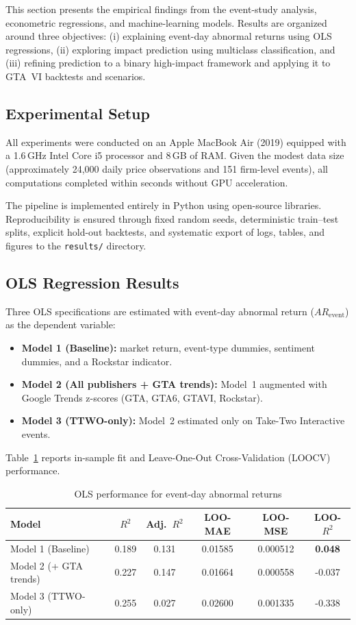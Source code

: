 \documentclass[11pt,a4paper]{article}
\begin{document}
This section presents the empirical findings from the event-study analysis, econometric regressions, and machine-learning models. Results are organized around three objectives: (i) explaining event-day abnormal returns using OLS regressions, (ii) exploring impact prediction using multiclass classification, and (iii) refining prediction to a binary high-impact framework and applying it to GTA~VI backtests and scenarios.

\subsection{Experimental Setup}

All experiments were conducted on an Apple MacBook Air (2019) equipped with a 1.6\,GHz Intel Core i5 processor and 8\,GB of RAM. Given the modest data size (approximately 24{,}000 daily price observations and 151 firm-level events), all computations completed within seconds without GPU acceleration.

The pipeline is implemented entirely in Python using open-source libraries. Reproducibility is ensured through fixed random seeds, deterministic train--test splits, explicit hold-out backtests, and systematic export of logs, tables, and figures to the \texttt{results/} directory.

\subsection{OLS Regression Results}

Three OLS specifications are estimated with event-day abnormal return ($AR_{\text{event}}$) as the dependent variable:

\begin{itemize}[itemsep=2pt]
    \item \textbf{Model 1 (Baseline):} market return, event-type dummies, sentiment dummies, and a Rockstar indicator.
    \item \textbf{Model 2 (All publishers + GTA trends):} Model~1 augmented with Google Trends z-scores (GTA, GTA6, GTAVI, Rockstar).
    \item \textbf{Model 3 (TTWO-only):} Model~2 estimated only on Take-Two Interactive events.
\end{itemize}

Table~\ref{tab:ols_results} reports in-sample fit and Leave-One-Out Cross-Validation (LOOCV) performance.

\begin{table}[H]
\centering
\caption{OLS performance for event-day abnormal returns}
\begin{tabular}{lccccc}
\hline
Model & $R^2$ & Adj.\ $R^2$ & LOO-MAE & LOO-MSE & LOO-$R^2$ \\
\hline
Model 1 (Baseline) & 0.189 & 0.131 & 0.01585 & 0.000512 & \textbf{0.048} \\
Model 2 (+ GTA trends) & 0.227 & 0.147 & 0.01664 & 0.000558 & -0.037 \\
Model 3 (TTWO-only) & 0.255 & 0.027 & 0.02600 & 0.001335 & -0.338 \\
\hline
\end{tabular}
\label{tab:ols_results}
\end{table}
\end{document}
